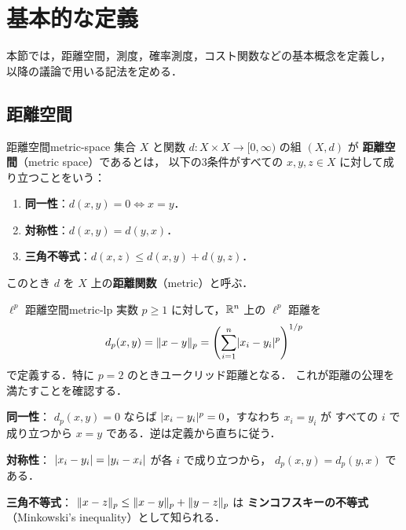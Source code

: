 \section{基本的な定義}
\label{sec:prerequisites}

本節では，距離空間，測度，確率測度，コスト関数などの基本概念を定義し，
以降の議論で用いる記法を定める．

\subsection{距離空間}
\label{subsec:metric-space}

\begin{definition}{距離空間}{metric-space}
  集合 $X$ と関数 $d \colon X \times X \to [0, \infty)$ の組 $(X, d)$ が
  \textbf{距離空間}（metric space）であるとは，
  以下の3条件がすべての $x, y, z \in X$ に対して成り立つことをいう：
  \begin{enumerate}
    \item \textbf{同一性}：$d(x, y) = 0 \iff x = y$．
    \item \textbf{対称性}：$d(x, y) = d(y, x)$．
    \item \textbf{三角不等式}：$d(x, z) \leq d(x, y) + d(y, z)$．
  \end{enumerate}
  このとき $d$ を $X$ 上の\textbf{距離関数}（metric）と呼ぶ．
\end{definition}

\begin{example}{$\ell^p$ 距離空間}{metric-lp}
  実数 $p \geq 1$ に対して，$\mathbb{R}^n$ 上の $\ell^p$ 距離を
  \[
    d_p(x, y) = \lVert x - y \rVert_p
    = \left(\sum_{i=1}^n \lvert x_i - y_i \rvert^p\right)^{1/p}
  \]
  で定義する．特に $p = 2$ のときユークリッド距離となる．
  これが距離の公理を満たすことを確認する．

  \textbf{同一性}：
  $d_p(x, y) = 0$ ならば $\lvert x_i - y_i \rvert^p = 0$，すなわち $x_i = y_i$ が
  すべての $i$ で成り立つから $x = y$ である．逆は定義から直ちに従う．

  \textbf{対称性}：
  $\lvert x_i - y_i \rvert = \lvert y_i - x_i \rvert$ が各 $i$ で成り立つから，
  $d_p(x, y) = d_p(y, x)$ である．

  \textbf{三角不等式}：
  $\lVert x - z \rVert_p \leq \lVert x - y \rVert_p + \lVert y - z \rVert_p$ は
  \textbf{ミンコフスキーの不等式}（Minkowski's inequality）として知られる．
\end{example}

